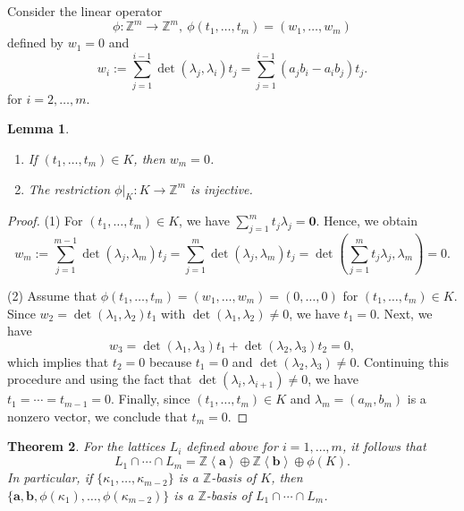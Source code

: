 \documentclass[10pt]{amsart}
\theoremstyle{plain}
\newtheorem{theorem}{Theorem}[section]
\newtheorem{lemma}[theorem]{Lemma}
\theoremstyle{definition}
\numberwithin{equation}{section}
\newcommand{\ZZ}{\mathbb{Z}}
\begin{document}
Consider the linear operator 
\begin{equation}\label{eq_phi_linear_operator}
\phi\colon \ZZ^m \to \ZZ^m,~\phi(t_1, \dots, t_m)=(w_1, \dots, w_m)
\end{equation}
defined by $w_1=0$ and
\[ %
w_i:=\sum_{j=1}^{i-1}\det(\lambda_j,\lambda_i)t_j = \sum_{j=1}^{i-1}(a_jb_i-a_ib_j)t_j.
\]
for $i=2, \dots, m$. 


\begin{lemma}\label{lem_w_m_0}
\begin{enumerate}
    \item If $(t_1, \dots, t_m)\in K$, then $w_m=0$. 
    \item The restriction $\phi|_K \colon K \to \ZZ^m$ is injective. 
\end{enumerate}
\end{lemma}
\begin{proof}
(1) For $(t_1, \dots, t_m)\in K$, we have $\sum_{j=1}^m t_j\lambda_j=\mathbf{0}$. 
Hence, we obtain  
\[
w_m:=\sum_{j=1}^{m-1}\det(\lambda_j,\lambda_m)t_j =\sum_{j=1}^{m}\det(\lambda_j,\lambda_m)t_j = \det \left( \sum_{j=1}^m t_j\lambda_j, \lambda_m\right)=0.  
\]

(2) Assume that $\phi(t_1, \dots, t_m)=(w_1, \dots, w_m)=(0,\dots, 0)$ for $(t_1, \dots, t_m)\in K$. Since $w_2=\det(\lambda_1, \lambda_2)t_1$ with  $\det(\lambda_1, \lambda_{2})\neq 0$, we have $t_1=0$. Next, we have 
\[
w_3=\det (\lambda_1, \lambda_3)t_1+\det (\lambda_2, \lambda_3)t_2=0,
\]
which implies that $t_2=0$ because $t_1=0$ and $\det (\lambda_2, \lambda_3)\neq 0$. Continuing this procedure and using the fact that $\det (\lambda_i, \lambda_{i+1})\neq 0$, we have $t_1=\cdots =t_{m-1}=0$. Finally, since $(t_1, \dots, t_m)\in K$ and $\lambda_m=(a_m, b_m)$ is a nonzero vector, we conclude that $t_m=0$. 
\end{proof}


\begin{theorem}\label{thm_main_lattice_intersection}
For the lattices $L_i$ defined above for $i=1, \dots, m$,  it follows that 
\[
L_1\cap \cdots \cap L_m = \mathbb{Z}\left<\mathbf{a}\right> \oplus \mathbb{Z}\left<\mathbf{b}\right>\oplus \phi(K).
\]
In particular, if $\{\kappa_1, \dots, \kappa_{m-2}\}$ is a $\mathbb{Z}$-basis of $K$, then
$\{ \mathbf{a}, \mathbf{b}, \phi(\kappa_1), \dots,  \phi(\kappa_{m-2})\}$
is a $\mathbb{Z}$-basis of $L_1\cap\cdots\cap L_m$.
\end{theorem}
\end{document}
